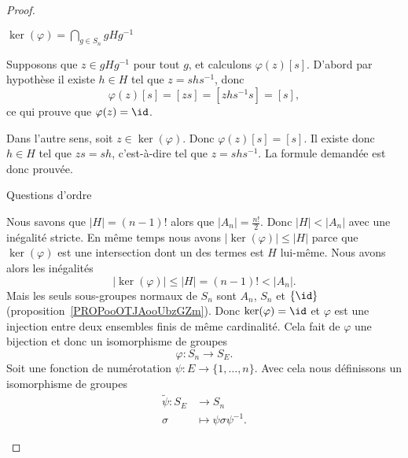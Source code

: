 \begin{proof}
\begin{subproof}
\begin{subproof}
                \item[\( \ker(\varphi)=\bigcap_{g\in S_n}gHg^{-1}\)]

                    Supposons que \( z\in gHg^{-1}\) pour tout \( g\), et calculons \( \varphi(z)[s]\). D'abord par hypothèse il existe \( h\in H\) tel que \( z=shs^{-1}\), donc
                    \begin{equation}
                        \varphi(z)[s]=[zs]=[zhs^{-1}s]=[s],
                    \end{equation}
                    ce qui prouve que \( \varphi(z)=\id\).

                    Dans l'autre sens, soit \( z\in\ker(\varphi)\). Donc \( \varphi(z)[s]=[s]\). Il existe donc \( h\in H\) tel que \( zs=sh\), c'est-à-dire tel que \( z=shs^{-1}\). La formule demandée est donc prouvée.

                \item[Questions d'ordre]

                    Nous savons que \( | H |=(n-1)!\) alors que \( | A_n |=\frac{ n! }{2}\). Donc \( | H |<| A_n |\) avec une inégalité stricte. En même temps nous avons \( | \ker(\varphi) |\leq | H |\) parce que \( \ker(\varphi)\) est une intersection dont un des termes est \( H\) lui-même. Nous avons alors les inégalités
                    \begin{equation}
                        | \ker(\varphi) |\leq | H |=(n-1)!<| A_n |.
                    \end{equation}
                    Mais les seuls sous-groupes normaux de \( S_n\) sont \( A_n\), \( S_n\) et \( \{ \id \}\) (proposition~\ref{PROPooOTJAooUbzGZm}). Donc \( \ker(\varphi)=\id\) et \( \varphi\) est une injection entre deux ensembles finis de même cardinalité. Cela fait de \( \varphi\) une bijection et donc un isomorphisme de groupes
                    \begin{equation}
                        \varphi\colon S_n\to S_E.
                    \end{equation}
                    Soit une fonction de numérotation \( \psi\colon E\to \{ 1,\ldots, n \}\). Avec cela nous définissons un isomorphisme de groupes
                    \begin{equation}
                        \begin{aligned}
                            \tilde \psi\colon S_E&\to S_n \\
                            \sigma&\mapsto \psi\sigma\psi^{-1}.
                        \end{aligned}
                    \end{equation}


\end{subproof}
\end{subproof}
\end{proof}
